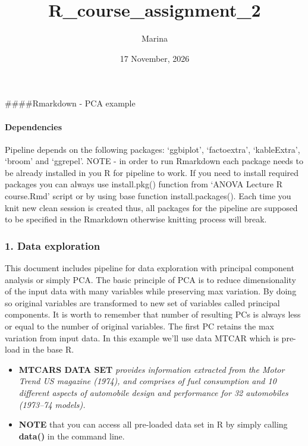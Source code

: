 \documentclass[
  5pt,
]{article}
\title{R\_course\_assignment\_2}
\author{Marina}
\date{17 November, 2026}
\begin{document}
\maketitle

\#\#\#\#Rmarkdown - PCA example

\paragraph{Dependencies}\label{dependencies}

Pipeline depends on the following packages: `ggbiplot', `factoextra',
`kableExtra', `broom' and `ggrepel'. NOTE - in order to run Rmarkdown
each package needs to be already installed in you R for pipeline to
work. If you need to install required packages you can always use
install.pkg() function from `ANOVA Lecture R course.Rmd' script or by
using base function install.packages(). Each time you knit new clean
session is created thus, all packages for the pipeline are supposed to
be specified in the Rmarkdown otherwise knitting process will break.

\subsubsection{1. Data exploration}\label{data-exploration}

This document includes pipeline for data exploration with principal
component analysis or simply PCA. The basic principle of PCA is to
reduce dimensionality of the input data with many variables while
preserving max variation. By doing so original variables are transformed
to new set of variables called principal components. It is worth to
remember that number of resulting PCs is always less or equal to the
number of original variables. The first PC retains the max variation
from input data. In this example we'll use data MTCAR which is pre-load
in the base R.

\begin{itemize}
\item
  \textbf{MTCARS DATA SET} \emph{provides information extracted from the
  Motor Trend US magazine (1974), and comprises of fuel consumption and
  10 different aspects of automobile design and performance for 32
  automobiles (1973--74 models).}
\item
  \textbf{NOTE} that you can access all pre-loaded data set in R by
  simply calling \textbf{data()} in the command line.
\end{itemize}
\end{document}
